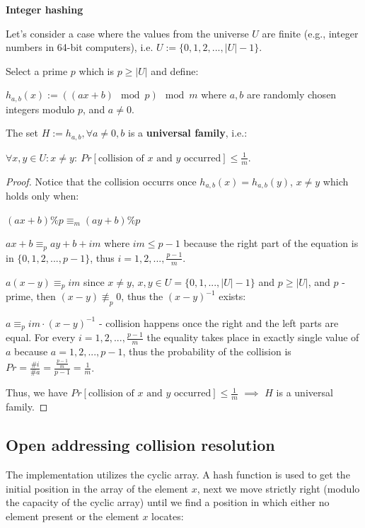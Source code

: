 \begin{theorem}\textbf{Integer hashing}

    Let's consider a case where the values from the universe $U$ are finite (e.g., integer numbers in 64-bit computers), i.e. $U := \{0, 1, 2, ..., |U| - 1\}$.

    Select a prime $p$ which is $p \geq |U|$ and define:

    $h_{a, b}(x) := ((ax + b) \mod p) \mod m$ where $a, b$ are randomly chosen integers modulo $p$, and $a \neq 0$.

    The set $H := {h_{a, b}, \forall a \neq 0, b}$ is a \textbf{universal family}, i.e.:

    $\forall x, y \in U: x \neq y: \ Pr[\text{collision of $x$ and $y$ occurred}] \leq \frac{1}{m}$.

\end{theorem}

\begin{proof}

    Notice that the collision occurrs once $h_{a,b}(x) = h_{a,b}(y)$, $x \neq y$ which holds only when:

    $(ax + b) \% p \equiv_{m} (ay + b) \% p$

    $ax + b \equiv_{p} ay + b + im$ where $im \leq p-1$ because the right part of the equation is in $\{0, 1, 2, ..., p-1\}$, thus $i=1, 2, ..., \frac{p-1}{m}$.

    $a (x-y) \equiv_{p} im$ since $x \neq y$, $x, y \in U = \{0, 1, ..., |U|-1\}$ and $p \geq |U|$, and $p$ - prime, then $(x-y) \not\equiv_{p} 0$, thus the $(x-y)^{-1}$ exists:

    $a \equiv_{p} im \cdot (x-y)^{-1}$ - collision happens once the right and the left parts are equal. For every $i=1, 2, ..., \frac{p-1}{m}$ the equality takes place in exactly single value of $a$ because $a=1, 2, ..., p-1$, thus the probability of the collision is $Pr=\frac{\#i}{\#a} = \frac{\frac{p-1}{m}}{p-1} = \frac{1}{m}$.

    Thus, we have $Pr[\text{collision of $x$ and $y$ occurred}] \leq \frac{1}{m}$ $\implies$ $H$ is a universal family.

\end{proof}

\subsection{Open addressing collision resolution}

The implementation utilizes the cyclic array. A hash function is used to get the initial position in the array of the element $x$, next we move strictly right (modulo the capacity of the cyclic array) until we find a position in which either no element present or the element $x$ locates:


